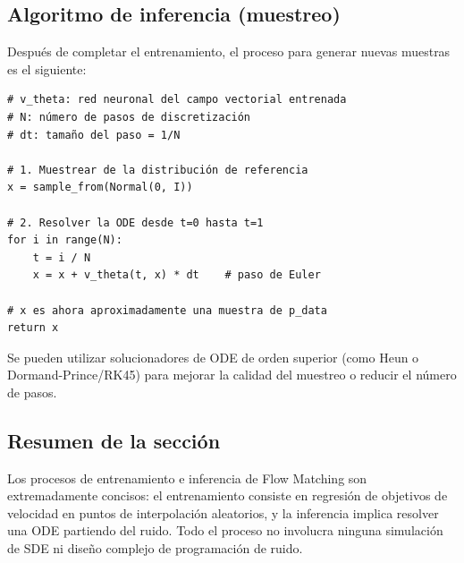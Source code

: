 \subsection{Algoritmo de inferencia (muestreo)}

Después de completar el entrenamiento, el proceso para generar nuevas muestras es el siguiente:

\begin{lstlisting}[caption={Algoritmo de muestreo de Flow Matching (método Euler)}]
# v_theta: red neuronal del campo vectorial entrenada
# N: número de pasos de discretización
# dt: tamaño del paso = 1/N

# 1. Muestrear de la distribución de referencia
x = sample_from(Normal(0, I))

# 2. Resolver la ODE desde t=0 hasta t=1
for i in range(N):
    t = i / N
    x = x + v_theta(t, x) * dt    # paso de Euler

# x es ahora aproximadamente una muestra de p_data
return x
\end{lstlisting}

Se pueden utilizar solucionadores de ODE de orden superior (como Heun o Dormand-Prince/RK45) para mejorar la calidad del muestreo o reducir el número de pasos.

\subsection{Resumen de la sección}

Los procesos de entrenamiento e inferencia de Flow Matching son extremadamente concisos: el entrenamiento consiste en regresión de objetivos de velocidad en puntos de interpolación aleatorios, y la inferencia implica resolver una ODE partiendo del ruido. Todo el proceso no involucra ninguna simulación de SDE ni diseño complejo de programación de ruido.

